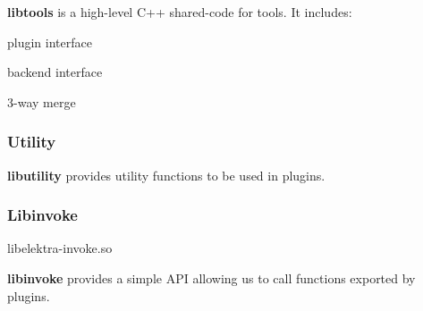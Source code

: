{\bfseries libtools} is a high-\/level C++ shared-\/code for tools. It includes\+:


\begin{DoxyItemize}
\item plugin interface
\item backend interface
\item 3-\/way merge
\end{DoxyItemize}

\subsubsection*{Utility}

{\bfseries libutility} provides utility functions to be used in plugins.

\subsubsection*{Libinvoke}

\begin{DoxyVerb}libelektra-invoke.so
\end{DoxyVerb}


{\bfseries libinvoke} provides a simple A\+PI allowing us to call functions exported by plugins. 